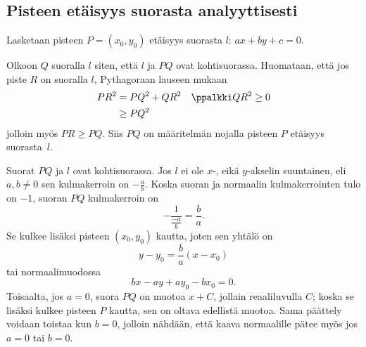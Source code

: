 \subsection*{Pisteen etäisyys suorasta analyyttisesti}

Lasketaan pisteen $P = (x_0, y_0)$ etäisyys suorasta $l$: $ax+by+c=0$.

Olkoon $Q$ suoralla $l$ siten, että $l$ ja $PQ$ ovat kohtisuorassa. Huomataan, että jos piste $R$ on suoralla $l$, Pythagoraan lauseen mukaan
\begin{align*}
  PR^2 &= PQ^2+QR^2 && \ppalkki QR^2 \geq 0\\
       &\geq PQ^2
\end{align*}
jolloin myös $PR \geq PQ$. Siis $PQ$ on määritelmän nojalla pisteen $P$ etäisyys suorasta~$l$.

Suorat $PQ$ ja $l$ ovat kohtisuorassa. Jos $l$ ei ole $x$-, eikä $y$-akselin suuntainen, eli $a,b \neq 0$ sen kulmakerroin on $-\frac{a}{b}$. Koska suoran ja normaalin kulmakerrointen tulo on $-1$, suoran $PQ$ kulmakerroin on
\[
-\frac{1}{\frac{-a}{b}} = \frac{b}{a}.
\]
Se kulkee lisäksi pisteen $(x_0,y_0)$ kautta, joten sen yhtälö on
\[
y-y_0 = \frac{b}{a}(x-x_0)
\]
tai normaalimuodossa
\[
bx-ay+ay_0-bx_0 = 0.
\]
Toisaalta, jos $a = 0$, suora $PQ$ on muotoa $x+C$, jollain reaaliluvulla $C$; koska se lisäksi kulkee pisteen $P$ kautta, sen on oltava edellistä muotoa. Sama päättely voidaan toistaa kun $b = 0$, jolloin nähdään, että kaava normaalille pätee myös jos $a = 0$ tai $b = 0$.

